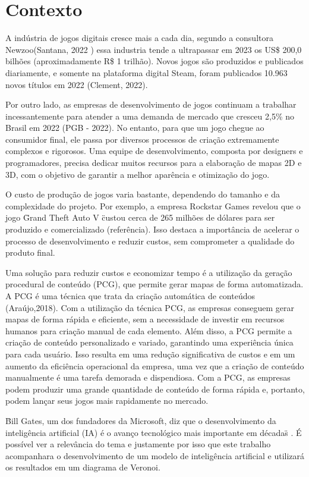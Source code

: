 \documentclass[
	12pt,				%
	openright,			%
	twoside,			%
	a4paper,			%
	english,			%
	french,				%
	spanish,			%
	brazil				%
	]{abntex2}
\begin{document}
\section*{Contexto}

A indústria de jogos digitais cresce mais a cada dia, segundo a consultora Newzoo(Santana, 2022 ) essa industria tende a ultrapassar em 2023 os US\$ 200,0 bilhões 
(aproximadamente R\$ 1 trilhão). Novos jogos são produzidos e publicados diariamente, e somente na plataforma digital Steam, foram publicados 10.963 novos títulos em 2022  
(Clement, 2022).

Por outro lado, as empresas de desenvolvimento de jogos continuam a trabalhar incessantemente para atender a uma demanda de mercado que cresceu 2,5\% no Brasil em 2022 
(PGB - 2022). No entanto, para que um jogo chegue ao consumidor final, ele passa por diversos processos de criação extremamente complexos e rigorosos. Uma equipe de 
desenvolvimento, composta por designers e programadores, precisa dedicar muitos recursos para a elaboração de mapas 2D e 3D, com o objetivo de garantir a melhor aparência 
e otimização do jogo.

O custo de produção de jogos varia bastante, dependendo do tamanho e da complexidade do projeto. Por exemplo, a empresa Rockstar Games revelou que o jogo \"Grand Theft Auto V
\" custou cerca de 265 milhões de dólares para ser produzido e comercializado (referência). Isso destaca a importância de acelerar o processo de desenvolvimento e reduzir custos, 
 sem comprometer a qualidade do produto final.

Uma solução para reduzir custos e economizar tempo é a utilização da geração procedural de conteúdo (PCG), que permite gerar mapas de forma automatizada. A PCG é uma técnica 
que trata da criação automática de conteúdos (Araújo,2018). Com a utilização da técnica PCG, as empresas conseguem gerar mapas de forma rápida e eficiente, sem a necessidade 
de investir em recursos humanos para criação manual de cada elemento. Além disso, a PCG permite a criação de conteúdo personalizado e variado, garantindo uma experiência única 
para cada usuário. Isso resulta em uma redução significativa de custos e em um aumento da eficiência operacional da empresa, uma vez que a criação de conteúdo manualmente é 
uma tarefa demorada e dispendiosa. Com a PCG, as empresas podem produzir uma grande quantidade de conteúdo de forma rápida e, portanto, podem lançar seus jogos mais rapidamente 
no mercado.

\"Bill Gates, um dos fundadores da Microsoft, diz que o desenvolvimento da inteligência artificial (IA) é o avanço tecnológico mais importante em décadas\"\space
\cite{inteligencia_artificial_e_avanco_bbc}. É possível ver
a relevância do tema e justamente por isso que este trabalho acompanhara o desenvolvimento
de um modelo de inteligência artificial e utilizará os resultados em um diagrama de Veronoi.
\end{document}
